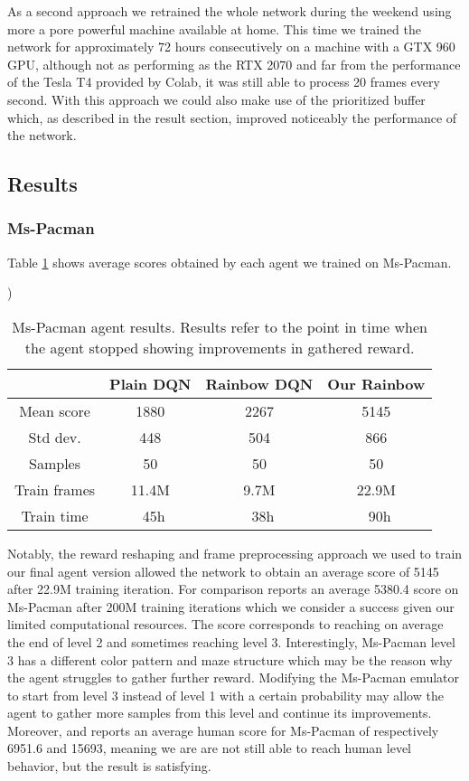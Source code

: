 \documentclass[10pt,twocolumn,letterpaper]{article}
\begin{document}
As a second approach we retrained the whole network during the weekend using more a pore powerful machine available at home. This time we trained the network for approximately 72 hours consecutively on a machine with a GTX 960 GPU, although not as performing as the RTX 2070 and far from the performance of the Tesla T4 provided by Colab, it was still able to process 20 frames every second. With this approach we could also make use of the prioritized buffer which, as described in the result section, improved noticeably the performance of the network.

\subsection{Results}

\subsubsection{Ms-Pacman}

Table \ref{tab:pacman_results} shows average scores obtained by each agent we trained on Ms-Pacman.

\begin{table})
	\begin{center}
		\begin{tabular}{ |c|c|c|c| } 
			\hline
			 & Plain DQN & Rainbow DQN & Our Rainbow \\ 
			 \hline
			Mean score & 1880 & 2267 & 5145 \\
			Std dev. & 448 & 504 & 866 \\
			Samples & 50 & 50 & 50 \\
			Train frames & 11.4M & 9.7M & 22.9M \\
			Train time & ~45h & ~38h & ~90h \\
			\hline
		\end{tabular}
	\end{center}
	\caption{Ms-Pacman agent results. Results refer to the point in time when the agent stopped showing improvements in gathered reward.}
	\label{tab:pacman_results}
\end{table}

Notably, the reward reshaping and frame preprocessing approach we used to train our final agent version allowed the network to obtain an average score of 5145 after 22.9M training iteration. For comparison \cite{DBLP:journals/corr/abs-1710-02298} reports an average 5380.4 score on Ms-Pacman after 200M training iterations which we consider a success given our limited computational resources.
The score corresponds to reaching on average the end of level 2 and sometimes reaching level 3. Interestingly, Ms-Pacman level 3 has a different color pattern and maze structure which may be the reason why the agent struggles to gather further reward. Modifying the Ms-Pacman emulator to start from level 3 instead of level 1 with a certain probability may allow the agent to gather more samples from this level and continue its improvements.
Moreover, \cite{DBLP:journals/corr/WangFL15} and \cite{humancontrol} reports an average human score for Ms-Pacman of respectively 6951.6 and 15693, meaning we are are not still able to reach human level behavior, but the result is satisfying.
\end{document}
